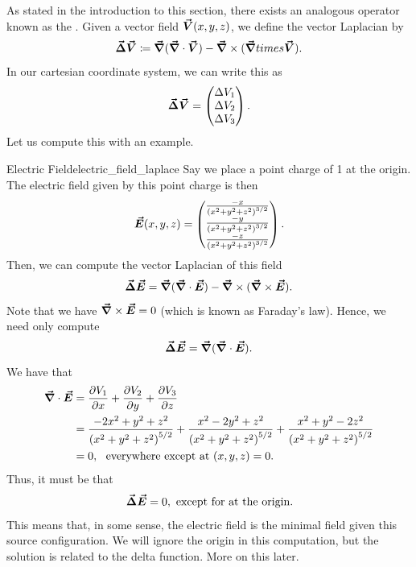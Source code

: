                As stated in the introduction to this section, there exists an analogous operator known as the .  Given a vector field $\boldsymbol{\vec{V}}(x,y,z)$, we define the vector Laplacian by
               \[
               \boldsymbol{\vec{\Delta}} \boldsymbol{\vec{V}} \coloneqq \boldsymbol{\vec{\nabla}}(\boldsymbol{\vec{\nabla}} \cdot \boldsymbol{\vec{V}})-\boldsymbol{\vec{\nabla}} \times (\boldsymbol{\vec{\nabla}} times \boldsymbol{\vec{V}}).
               \]
               In our cartesian coordinate system, we can write this as
               \[
               \boldsymbol{\vec{\Delta}} \boldsymbol{\vec{V}} = \begin{pmatrix} \Delta V_1 \\ \Delta V_2 \\ \Delta V_3 \end{pmatrix}.          
               \]
               Let us compute this with an example.  
               
               \begin{ex}{Electric Field}{electric_field_laplace}
               Say we place a point charge of 1 at the origin.  The electric field given by this point charge is then
               \[
               \boldsymbol{\vec{E}}(x,y,z) = \begin{pmatrix} \frac{-x}{\left(x^2+y^2+z^2\right)^{3/2}} \\ \frac{-y}{\left(x^2+y^2+z^2\right)^{3/2}} \\ \frac{-z}{\left(x^2+y^2+z^2\right)^{3/2}} \end{pmatrix}.
               \]
               Then, we can compute the vector Laplacian of this field
               \[
               \boldsymbol{\vec{\Delta}} \boldsymbol{\vec{E}} = \boldsymbol{\vec{\nabla}}(\boldsymbol{\vec{\nabla}} \cdot \boldsymbol{\vec{E}}) - \boldsymbol{\vec{\nabla}} \times (\boldsymbol{\vec{\nabla}} \times \boldsymbol{\vec{E}}).
               \]
               Note that we have $\boldsymbol{\vec{\nabla}} \times \boldsymbol{\vec{E}} = 0$ (which is known as Faraday's law). Hence, we need only compute
               \[
               \boldsymbol{\vec{\Delta}} \boldsymbol{\vec{E}} = \boldsymbol{\vec{\nabla}}(\boldsymbol{\vec{\nabla}}\cdot \boldsymbol{\vec{E}}).
               \] 
               We have that
               \begin{align*}
               \boldsymbol{\vec{\nabla}} \cdot \boldsymbol{\vec{E}} &= \frac{\partial V_1}{\partial x} +  \frac{\partial V_2}{\partial y} +  \frac{\partial V_3}{\partial z}\\
               &= \frac{-2x^2+y^2+z^2}{\left(x^2+y^2+z^2\right)^{5/2}} + \frac{x^2-2y^2+z^2}{\left(x^2+y^2+z^2\right)^{5/2}}+\frac{x^2+y^2-2z^2}{\left(x^2+y^2+z^2\right)^{5/2}}\\
               &= 0, \textrm{~ everywhere except at $(x,y,z)=0$}.
               \end{align*}
               Thus, it must be that
               \[
               \boldsymbol{\vec{\Delta}} \boldsymbol{\vec{E}} = 0, \textrm{~except for at the origin.}
               \]
                 This means that, in some sense, the electric field is the minimal field given this source configuration.  We will ignore the origin in this computation, but the solution is related to the delta function.  More on this later.
               \end{ex}
               
